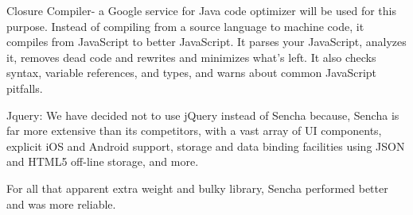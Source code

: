 Closure Compiler- a Google service for Java code optimizer will be used for this purpose. Instead of compiling from a source language to machine code, it compiles from JavaScript to better JavaScript. It parses your JavaScript, analyzes it, removes dead code and rewrites and minimizes what's left. 
It also checks syntax, variable references, and types, and warns about common JavaScript pitfalls. 

Jquery: We have decided not to use jQuery instead of Sencha because, Sencha is far more extensive than its competitors, with a vast array of UI    
components, explicit iOS and Android support, storage and data binding facilities using JSON and HTML5 off-line storage, and more.

For all that apparent extra weight and bulky library, Sencha performed better and was more reliable.

